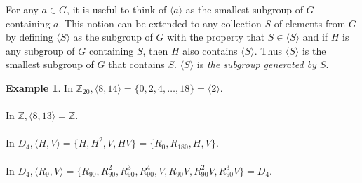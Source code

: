 \documentclass{article}
\newtheorem{theorem}{Theorem}[section]
\theoremstyle{definition}
\newtheorem{definition}{Definition}[section]
\newtheorem{example}{Example}[section]
\begin{document}
    For any $a \in G$, it is useful to think of $\langle a \rangle$ as the smallest subgroup of $G$ containing $a$. This notion can be extended to any collection $S$ of elements from $G$ by defining $\langle S \rangle$ as the subgroup of $G$ with the property that $S \in \langle S \rangle$ and if $H$ is any subgroup of $G$ containing $S$, then $H$ also contains $\langle S \rangle$. Thus $\langle S \rangle$ is the smallest subgroup of $G$ that contains $S$. $\langle S \rangle$ is \textit{the subgroup generated by $S$}.
    
    \begin{example}
    In $\mathbb{Z}_{20},\langle 8,14 \rangle = \{0,2,4,\dots,18\}=\langle 2 \rangle$. 
    \\ \\
    In $\mathbb{Z}, \langle 8,13 \rangle = \mathbb{Z}$.
    \\ \\
    In $D_4, \langle H,V \rangle = \{H,H^2,V,HV\} = \{R_0,R_{180},H,V\}$.
    \\ \\
    In $D_4, \langle R_{9},V\rangle = \{R_{90},R_{90}^2,R_{90}^3,R_{90}^4,V,R_{90}V,R_{90}^2V,R_{90}^3V\}=D_4$.
    \end{example}
    
    \noindent{}
    \\ \\
    
\end{document}
